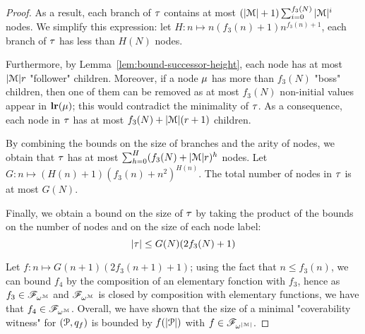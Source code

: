 \begin{proof}
	As a result, each branch of $\tau$ contains at most $(|\mathcal{M}|+1) \sum_{i=0}^{f_3(N)}|\mathcal{M}|^{i}$ nodes. We simplify this expression: let $H: n \mapsto n (f_3(n)+1) n^{f_3(n)+1}$, each branch of $\tau$ has less than $H(N)$ nodes.
	
	Furthermore, by Lemma~\ref{lem:bound-successor-height}, each node has at most $|\mathcal{M}|r$ "follower" children. Moreover, if a node $\mu$ has more than $f_3(N)$ "boss" children, then one of them can be removed as at most $f_3(N)$ non-initial values appear in $\mathbf{lr}(\mu)$; this would contradict the minimality of $\tau$.	
	As a consequence, each node in $\tau$ has at most $f_3(N) + |\mathcal{M}|(r+1)$ children.

	
	By combining the bounds on the size of branches and the arity of nodes, we obtain that $\tau$ has at most $\sum_{h=0}^{H} (f_3(N) + |\mathcal{M}|r)^h$ nodes. Let $G: n \mapsto (H(n)+1)(f_3(n) + n^2)^{H(n)}$. The total number of nodes in $\tau$ is at most $G(N)$.
	
	Finally, we obtain a bound on the size of $\tau$ by taking the product of the bounds on the number of nodes and on the size of each node label: 
	\[ |\tau| \leq  G(N) (2 f_3(N)+1)\]
	
	Let $f: n \mapsto  G(n+1) (2 f_3(n+1) +1)$; using the fact that $n \leq f_3(n)$, we can bound $f_4$ by the composition of an elementary fonction with $f_3$, hence as $f_3 \in \mathscr{F}_{\omega^{\mathcal{M}}}$ and $\mathscr{F}_{\omega^{\mathcal{M}}}$ is closed by composition with elementary functions, we have that $f_4 \in \mathscr{F}_{\omega^{\mathcal{M}}}$.
	Overall, we have shown that the size of a minimal "coverability witness" for $(\mathcal{P},q_f)$ is bounded by $f(|\mathcal{P}|)$ with $f \in \mathscr{F}_{\omega^{|\mathcal{M}|}}$.
\end{proof}

